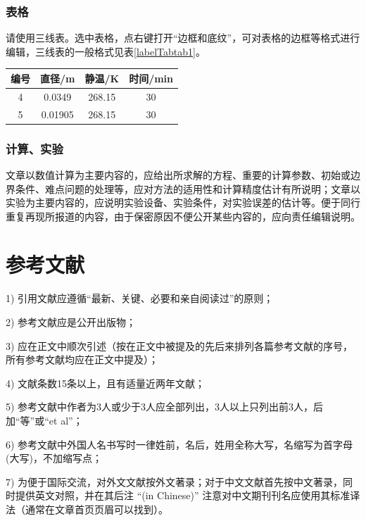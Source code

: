 \documentclass[10.5pt,twocolumn]{jbuaa}
\begin{document}
\subsubsection{表格}
请使用三线表。选中表格，点右键打开``边框和底纹”，可对表格的边框等格式进行编辑，三线表的一般格式见表\ref{labelTabtab1}。
\begin{table}[h]
\centering
\captionnamefont{\xiaowuhao\bf }
\captiontitlefont{\xiaowuhao\bf }
\renewcommand\tabcolsep{1em}
\begin{tabular}{cccc}
\toprule
{编号} &  {直径}/\si{\metre} & {静温}/\si{\kelvin} & {时间}/min\\
\midrule 
4 & 0.0349 & 268.15 & 30\\
5 & 0.01905 & 268.15 & 30\\
\bottomrule
\end{tabular}
\end{table}

\subsubsection{计算、实验}
文章以数值计算为主要内容的，应给出所求解的方程、重要的计算参数、初始或边界条件、难点问题的处理等，应对方法的适用性和计算精度估计有所说明；文章以实验为主要内容的，应说明实验设备、实验条件，对实验误差的估计等。便于同行重复再现所报道的内容，由于保密原因不便公开某些内容的，应向责任编辑说明。

\section{参考文献}
1) 引用文献应遵循``最新、关键、必要和亲自阅读过”的原则；

2) 参考文献应是公开出版物；

3) 应在正文中顺次引述（按在正文中被提及的先后来排列各篇参考文献的序号，所有参考文献均应在正文中提及）；

4) 文献条数15条以上，且有适量近两年文献；

5) 参考文献中作者为3人或少于3人应全部列出，3人以上只列出前3人，后加``等”或``et al”；

6) 参考文献中外国人名书写时一律姓前，名后，姓用全称大写，名缩写为首字母(大写)，不加缩写点；

7) 为便于国际交流，对外文文献按外文著录；对于中文文献首先按中文著录，同时提供英文对照，并在其后注 ``(in Chinese)” 注意对中文期刊刊名应使用其标准译法（通常在文章首页页眉可以找到）。
\end{document}
